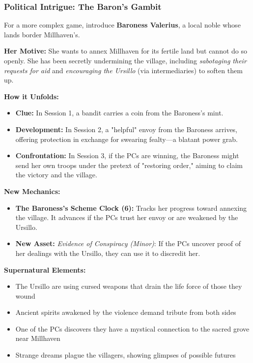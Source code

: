 \documentclass[11pt]{article}
\newenvironment{mechanic}[1]{%
  \begin{mdframed}[backgroundcolor=tableheader, linewidth=1pt, linecolor=accentcolor]%
  \subsubsection*{#1}%
}{%
  \end{mdframed}%
}
\begin{document}
\begin{mechanic}{Political Intrigue: The Baron's Gambit}

For a more complex game, introduce \textbf{Baroness Valerius}, a local noble whose lands border Millhaven's.

\textbf{Her Motive:} She wants to annex Millhaven for its fertile land but cannot do so openly. She has been secretly undermining the village, including \textit{sabotaging their requests for aid} and \textit{encouraging the Ursillo} (via intermediaries) to soften them up.

\textbf{How it Unfolds:}
\begin{itemize}
\item \textbf{Clue:} In Session 1, a bandit carries a coin from the Baroness's mint.
\item \textbf{Development:} In Session 2, a "helpful" envoy from the Baroness arrives, offering protection in exchange for swearing fealty—a blatant power grab.
\item \textbf{Confrontation:} In Session 3, if the PCs are winning, the Baroness might send her own troops under the pretext of "restoring order," aiming to claim the victory and the village.
\end{itemize}

\textbf{New Mechanics:}
\begin{itemize}
\item \textbf{The Baroness's Scheme Clock (6):} Tracks her progress toward annexing the village. It advances if the PCs trust her envoy or are weakened by the Ursillo.
\item \textbf{New Asset:} \textit{Evidence of Conspiracy (Minor)}: If the PCs uncover proof of her dealings with the Ursillo, they can use it to discredit her.
\end{itemize}

\end{mechanic}

\textbf{Supernatural Elements:}
\begin{itemize}
\item The Ursillo are using cursed weapons that drain the life force of those they wound
\item Ancient spirits awakened by the violence demand tribute from both sides
\item One of the PCs discovers they have a mystical connection to the sacred grove near Millhaven
\item Strange dreams plague the villagers, showing glimpses of possible futures
\end{itemize}
\end{document}
